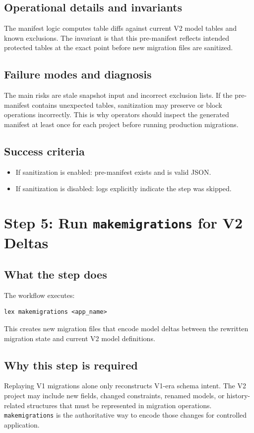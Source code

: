 \documentclass[11pt,a4paper]{article}
\begin{document}
\subsection*{Operational details and invariants}
The manifest logic computes table diffs against current V2 model tables and known exclusions.
The invariant is that this pre-manifest reflects intended protected tables at the exact point
before new migration files are sanitized.

\subsection*{Failure modes and diagnosis}
The main risks are stale snapshot input and incorrect exclusion lists. If the pre-manifest
contains unexpected tables, sanitization may preserve or block operations incorrectly. This is
why operators should inspect the generated manifest at least once for each project before
running production migrations.

\subsection*{Success criteria}
\begin{itemize}[leftmargin=1.5em]
  \item If sanitization is enabled: pre-manifest exists and is valid JSON.
  \item If sanitization is disabled: logs explicitly indicate the step was skipped.
\end{itemize}

\newpage
\section{Step 5: Run \texttt{makemigrations} for V2 Deltas}
\subsection*{What the step does}
The workflow executes:
\begin{verbatim}
lex makemigrations <app_name>
\end{verbatim}
This creates new migration files that encode model deltas between the rewritten migration
state and current V2 model definitions.

\subsection*{Why this step is required}
Replaying V1 migrations alone only reconstructs V1-era schema intent. The V2 project may
include new fields, changed constraints, renamed models, or history-related structures that
must be represented in migration operations. \texttt{makemigrations} is the authoritative way
to encode those changes for controlled application.
\end{document}
